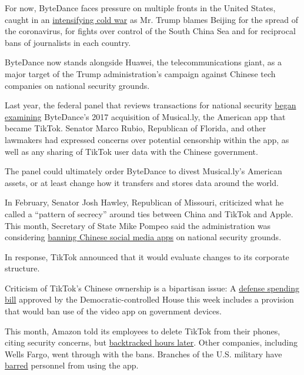 For now, ByteDance faces pressure on multiple fronts in the United
States, caught in an
\href{https://www.nytimes.com/2020/07/22/world/asia/us-china-cold-war.html}{intensifying
cold war} as Mr. Trump blames Beijing for the spread of the coronavirus,
for fights over control of the South China Sea and for reciprocal bans
of journalists in each country.

ByteDance now stands alongside Huawei, the telecommunications giant, as
a major target of the Trump administration's campaign against Chinese
tech companies on national security grounds.

Last year, the federal panel that reviews transactions for national
security
\href{https://www.nytimes.com/2019/11/01/technology/tiktok-national-security-review.html}{began
examining} ByteDance's 2017 acquisition of Musical.ly, the American app
that became TikTok. Senator Marco Rubio, Republican of Florida, and
other lawmakers had expressed concerns over potential censorship within
the app, as well as any sharing of TikTok user data with the Chinese
government.

The panel could ultimately order ByteDance to divest Musical.ly's
American assets, or at least change how it transfers and stores data
around the world.

In February, Senator Josh Hawley, Republican of Missouri, criticized
what he called a ``pattern of secrecy'' around ties between China and
TikTok and Apple. This month, Secretary of State Mike Pompeo said the
administration was considering
\href{https://www.politico.com/news/2020/07/07/mike-pompeo-tiktok-ban-350384}{banning
Chinese social media apps} on national security grounds.

In response, TikTok announced that it would evaluate changes to its
corporate structure.

Criticism of TikTok's Chinese ownership is a bipartisan issue: A
\href{https://thehill.com/policy/technology/508412-house-approved-defense-bill-would-ban-tiktok-from-government-devices}{defense
spending bill} approved by the Democratic-controlled House this week
includes a provision that would ban use of the video app on government
devices.

This month, Amazon told its employees to delete TikTok from their
phones, citing security concerns, but
\href{https://www.nytimes.com/2020/07/10/technology/tiktok-amazon-security-risk.html}{backtracked
hours later}. Other companies, including Wells Fargo, went through with
the bans. Branches of the U.S. military have
\href{https://www.nytimes.com/2020/01/04/us/tiktok-pentagon-military-ban.html}{barred}
personnel from using the app.

